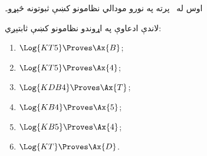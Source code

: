 \documentclass[../../../include/open-logic-section]{subfiles}
\begin{document}


اوس له~ پرته په نورو مودالي نظامونو کښې ثبوتونه څېړو۔

\begin{prop}
لاندې ادعاوې په اړوندو نظامونو کښې ثابتېږي:
  \begin{enumerate}
  \item $\Log{KT5} \Proves \Ax{B}$;
  \item $\Log{KT5} \Proves \Ax{4}$;
  \item $\Log{KDB4} \Proves \Ax{T}$;
  \item $\Log{KB4} \Proves \Ax{5}$;
  \item $\Log{KB5} \Proves \Ax{4}$;
  \item {}$\Log{KT} \Proves \Ax{D}$.
  \end{enumerate}
\end{prop}
\end{document}

